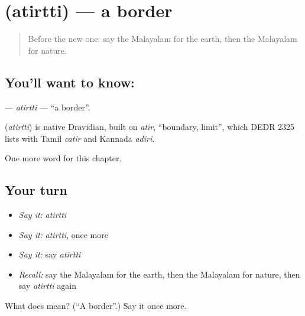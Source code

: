 \section[\texorpdfstring{\ml{അതിർത്തി} (atirtti)}{അതിർത്തി (atirtti)}]{ (atirtti) — a border}

\label{lesson:ML-C316-atirtti}



\begin{quote}
Before the new one: say the Malayalam for the earth, then the Malayalam for nature.
\end{quote}

\subsection*{You'll want to know: }
\textbf{} — \emph{atirtti} — \textquotedblleft{}a border\textquotedblright{}.

\begin{cousinweb}
\textbf{} (\emph{atirtti}) is native Dravidian, built on \emph{atir}, \textquotedblleft{}boundary, limit\textquotedblright{}, which DEDR 2325 lists with Tamil \emph{catir} and Kannada \emph{adiri}.
\end{cousinweb}

\begin{grammarlens}[title={What you've built}]
One more word for this chapter.
\end{grammarlens}

\subsection*{Your turn}
\begin{itemize}
\raggedright
  \item \emph{Say it:} \emph{atirtti}
  \item \emph{Say it:} \emph{atirtti}, once more
  \item \emph{Say it:} say \emph{atirtti}
  \item \emph{Recall:} say the Malayalam for the earth, then the Malayalam for nature, then say \emph{atirtti} again
\end{itemize}

\begin{tcolorbox}[breakable,colback=teal!4,colframe=teal!35!black,title={Before you move on}]
What does  mean? (\textquotedblleft{}A border\textquotedblright{}.) Say it once more.
\end{tcolorbox}
